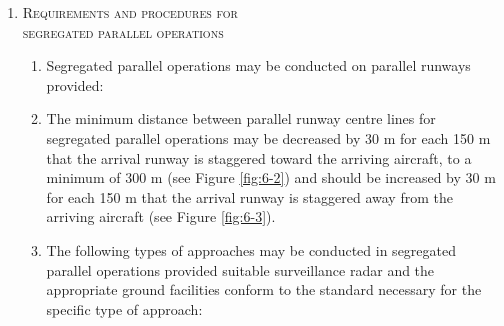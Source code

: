 \documentclass[../main.tex]{subfiles}
\begin{document}
\begin{enumerate}[itemsep=0.2cm]
\begin{enumerate}
        \end{enumerate}

        \item \textsc{Requirements and procedures for \\ segregated parallel operations}
        \begin{enumerate}
            \item \label{6.7.3.5.1} Segregated parallel operations may be conducted on parallel runways provided:


            \item \label{6.7.3.5.2} The minimum distance between parallel runway centre lines for segregated parallel operations may be decreased by 30 m for each 150 m that the arrival runway is staggered toward the arriving aircraft, to a minimum of 300 m (see Figure \ref{fig:6-2}) and should be increased by 30 m for each 150 m that the arrival runway is staggered away from the arriving aircraft (see Figure \ref{fig:6-3}).


            
            
            \item The following types of approaches may be conducted in segregated parallel operations provided suitable surveillance radar and the appropriate ground facilities conform to the standard necessary for the specific type of approach:


\end{enumerate}
\end{enumerate}
\end{document}
